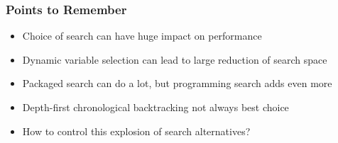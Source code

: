 \begin{frame}
\frametitle{Points to Remember}
\begin{itemize}
\item Choice of search can have huge impact on performance
\item Dynamic variable selection can lead to large reduction of search space
\item Packaged search can do a lot, but programming search adds even more
\item Depth-first chronological backtracking not always best choice
\item How to control this explosion of search alternatives?
\end{itemize}
\end{frame}

